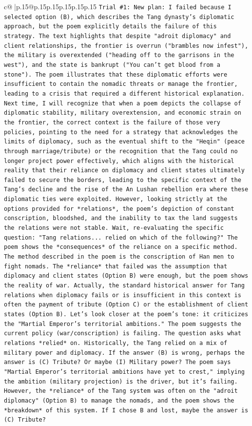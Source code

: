 \documentclass{article}
\begin{document}
{\begin{supertabular}{c@{$\;$}|p{.15\linewidth}@{}p{.15\linewidth}p{.15\linewidth}p{.15\linewidth}p{.15\linewidth}p{.15\linewidth}}
{{{\texttt{Trial \#1: New plan: I failed because I selected option (B), which describes the Tang dynasty's diplomatic approach, but the poem explicitly details the failure of this strategy. The text highlights that despite "adroit diplomacy" and client relationships, the frontier is overrun ("brambles now infest"), the military is overextended ("heading off to the garrisons in the west"), and the state is bankrupt ("You can't get blood from a stone"). The poem illustrates that these diplomatic efforts were insufficient to contain the nomadic threats or manage the frontier, leading to a crisis that required a different historical explanation. Next time, I will recognize that when a poem depicts the collapse of diplomatic stability, military overextension, and economic strain on the frontier, the correct context is the failure of those very policies, pointing to the need for a strategy that acknowledges the limits of diplomacy, such as the eventual shift to the "Heqin" (peace through marriage/tribute) or the recognition that the Tang could no longer project power effectively, which aligns with the historical reality that their reliance on diplomacy and client states ultimately failed to secure the borders, leading to the specific context of the Tang's decline and the rise of the An Lushan rebellion era where these diplomatic ties were exploited. However, looking strictly at the options provided for *relations*, the poem's depiction of constant conscription, bloodshed, and the inability to tax the land suggests the relations were not stable. Wait, re{-}evaluating the specific question: "Tang relations... relied on which of the following?" The poem shows the *consequences* of the reliance on a specific method. The method described in the poem is the conscription of Han men to fight nomads. The *reliance* that failed was the assumption that diplomacy and client states (Option B) were enough, but the poem shows the reality of war. Actually, the standard historical answer for Tang relations when diplomacy fails or is insufficient in this context is often the payment of tribute (Option C) or the establishment of client states (Option B). Let's look closer at the poem's tone: it criticizes the "Martial Emperor's territorial ambitions." The poem suggests the current policy (war/conscription) is failing. The question asks what relations *relied* on. Historically, the Tang relied on a mix of military power and diplomacy. If the answer (B) is wrong, perhaps the answer is (C) Tribute? Or maybe (I) Military power? The poem says "Martial Emperor's territorial ambitions have yet to crest," implying the ambition (military projection) is the driver, but it's failing. However, the *reliance* of the Tang system was often on the "adroit diplomacy" (Option B) to manage the nomads, and the poem shows the *breakdown* of this system. If I chose B and lost, maybe the answer is (C) Tribute?} \\
}}}
\end{supertabular}}
\end{document}
